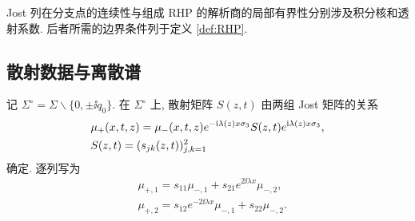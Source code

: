 \begin{remark}
Jost 列在分支点的连续性与组成 RHP 的解析商的局部有界性分别涉及积分核和透射系数. 后者所需的边界条件列于定义 \ref{def:RHP}.
\end{remark}

\subsection{散射数据与离散谱}\label{ch:symmetry}\label{ch:discrete}
记 $\Sigma^\circ=\Sigma\mathbin{\backslash}\{0,\pm\ii q_0\}$.
在 $\Sigma^\circ$ 上, 散射矩阵 $S(z,t)$ 由两组 Jost 矩阵的关系
\begin{equation}\label{eq:Sdef}
\begin{aligned}
&\mu_+(x,t,z)=\mu_-(x,t,z)e^{-\mathrm{i}\lambda(z)x\sigma_3}S(z,t)e^{\mathrm{i}\lambda(z)x\sigma_3},\\
&S(z,t)=(s_{jk}(z,t))_{j,k=1}^{2}
\end{aligned}
\end{equation}
确定. 逐列写为
\begin{equation}\label{eq:scattering-columns}
\begin{aligned}
&\mu_{+,1}=s_{11}\mu_{-,1}+s_{21}e^{2\ii\lambda x}\mu_{-,2},\\
&\mu_{+,2}=s_{12}e^{-2\ii\lambda x}\mu_{-,1}+s_{22}\mu_{-,2}.
\end{aligned}
\end{equation}

